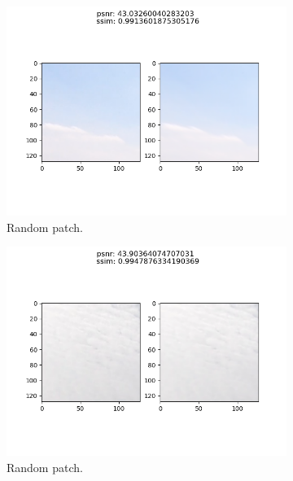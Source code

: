 \begin{enumerate}
    \begin{figure}[H]
        \centering
        \begin{subfigure}{0.475\textwidth}
            \centering
            \includegraphics[scale=0.4]{subsections/srndeblur/image_sky_high_psnr.png}
            \caption{Random patch.}
            \label{high_ssim_patch1}
        \end{subfigure}
        \centering
        \begin{subfigure}{0.475\textwidth}
            \includegraphics[scale=0.4]{subsections/srndeblur/image_sky_high_psnr.2.png}
            \caption{Random patch.}
            \label{high_ssim_patch2}
        \end{subfigure}
        \begin{subfigure}{0.475\textwidth}

\end{subfigure}
\end{figure}
\end{enumerate}
